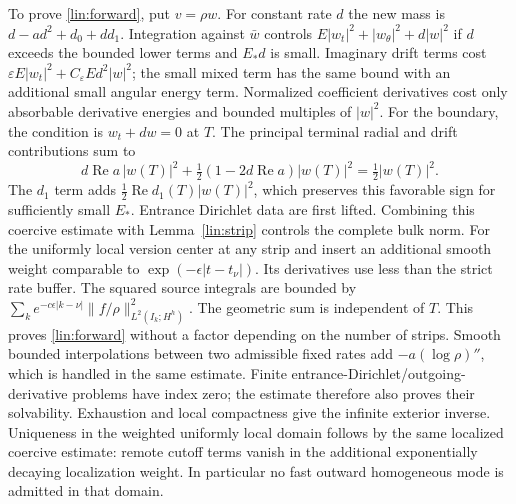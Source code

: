 To prove \eqref{lin:forward}, put $v=\rho w$.  For constant rate $d$ the
new mass is $d-ad^2+d_0+dd_1$.  Integration against $\bar w$ controls
$E|w_t|^2+|w_\theta|^2+d|w|^2$ if $d$ exceeds the bounded lower terms
and $E_*d$ is small.  Imaginary drift terms cost
$\varepsilon E|w_t|^2+C_\varepsilon Ed^2|w|^2$; the small mixed term
has the same bound with an additional small angular energy term.
Normalized coefficient derivatives cost only absorbable derivative
energies and bounded multiples of $|w|^2$.  For the boundary, the
condition is $w_t+dw=0$ at $T$.  The principal terminal radial and
drift contributions sum to
\[
 d\operatorname{Re}a\,|w(T)|^2
       +\tfrac12(1-2d\operatorname{Re}a)|w(T)|^2
 =\tfrac12|w(T)|^2.
\]
The $d_1$ term adds $\tfrac12\operatorname{Re}d_1(T)|w(T)|^2$,
which preserves this favorable sign for sufficiently small $E_*$.
Entrance Dirichlet data are first lifted.  Combining this coercive
estimate with Lemma~\ref{lin:strip} controls the complete bulk norm.
For the uniformly local version center at any strip and insert an
additional smooth weight comparable to
$\exp(-\epsilon|t-t_\nu|)$.  Its derivatives use less than the strict
rate buffer.  The squared source integrals are bounded by
$\sum_k e^{-c\epsilon|k-\nu|}\|f/\rho\|_{L^2(I_k;H^h)}^2$.
The geometric sum is independent of $T$.  This proves
\eqref{lin:forward} without a factor depending on the number of strips.
Smooth bounded interpolations between two admissible fixed rates add
$-a(\log\rho)''$, which is handled in the same estimate.
Finite entrance-Dirichlet/outgoing-derivative problems have index zero;
the estimate therefore also proves their solvability.  Exhaustion and
local compactness give the infinite exterior inverse.  Uniqueness in
the weighted uniformly local domain follows by the same localized
coercive estimate: remote cutoff terms vanish in the additional
exponentially decaying localization weight.  In particular no fast
outward homogeneous mode is admitted in that domain.

